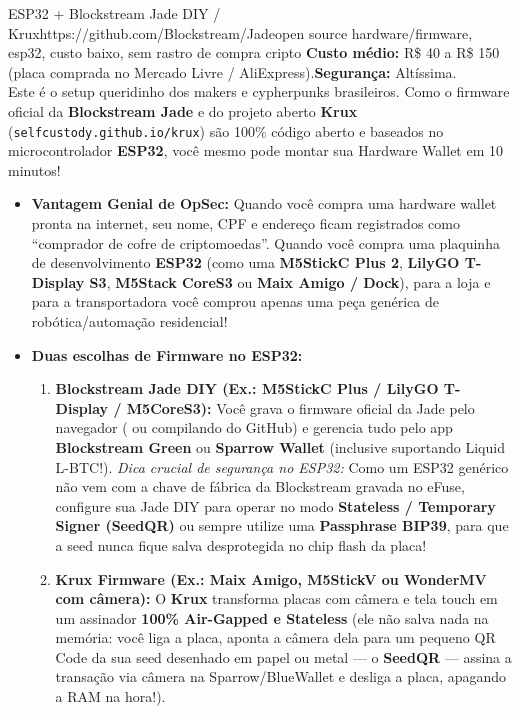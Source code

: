 \documentclass{pousadaguide}
\begin{document}
\begin{ferramenta}[goat,logo=jade,logo2=krux]{ESP32 + Blockstream Jade DIY / Krux}{https://github.com/Blockstream/Jade}{open source hardware/firmware, esp32, custo baixo, sem rastro de compra cripto}
\textbf{Custo médio:} R\$ 40 a R\$ 150 (placa comprada no Mercado Livre / AliExpress).\quad \textbf{Segurança:} Altíssima.\\[1mm]
Este é o setup queridinho dos makers e cypherpunks brasileiros. Como o firmware oficial da \textbf{Blockstream Jade} e do projeto aberto \textbf{Krux} (\texttt{selfcustody.github.io/krux}) são 100\% código aberto e baseados no microcontrolador \textbf{ESP32}, você mesmo pode montar sua Hardware Wallet em 10 minutos!
\begin{itemize}
  \item \textbf{Vantagem Genial de OpSec:} Quando você compra uma hardware wallet pronta na internet, seu nome, CPF e endereço ficam registrados como ``comprador de cofre de criptomoedas''. Quando você compra uma plaquinha de desenvolvimento \textbf{ESP32} (como uma \textbf{M5StickC Plus 2}, \textbf{LilyGO T-Display S3}, \textbf{M5Stack CoreS3} ou \textbf{Maix Amigo / Dock}), para a loja e para a transportadora você comprou apenas uma peça genérica de robótica/automação residencial!
  \item \textbf{Duas escolhas de Firmware no ESP32:}
  \begin{enumerate}
    \item \textbf{Blockstream Jade DIY (Ex.: M5StickC Plus / LilyGO T-Display / M5CoreS3):} Você grava o firmware oficial da Jade pelo navegador ( ou compilando do GitHub) e gerencia tudo pelo app \textbf{Blockstream Green} ou \textbf{Sparrow Wallet} (inclusive suportando Liquid L-BTC!). \emph{Dica crucial de segurança no ESP32:} Como um ESP32 genérico não vem com a chave de fábrica da Blockstream gravada no eFuse, configure sua Jade DIY para operar no modo \textbf{Stateless / Temporary Signer (SeedQR)} ou sempre utilize uma \textbf{Passphrase BIP39}, para que a seed nunca fique salva desprotegida no chip flash da placa!
    \item \textbf{Krux Firmware (Ex.: Maix Amigo, M5StickV ou WonderMV com câmera):} O \textbf{Krux} transforma placas com câmera e tela touch em um assinador \textbf{100\% Air-Gapped e Stateless} (ele não salva nada na memória: você liga a placa, aponta a câmera dela para um pequeno QR Code da sua seed desenhado em papel ou metal — o \textbf{SeedQR} — assina a transação via câmera na Sparrow/BlueWallet e desliga a placa, apagando a RAM na hora!).
  \end{enumerate}
\end{itemize}
\end{ferramenta}
\end{document}
